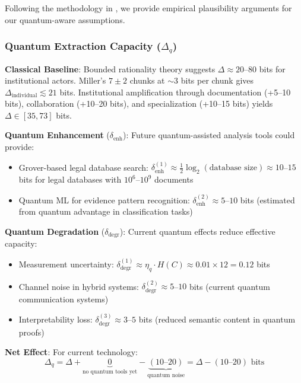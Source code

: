 \documentclass{ieeeaccess}
\begin{document}
Following the methodology in \cite[Section IV-B]{Minka2026CRO}, we provide empirical plausibility arguments for our quantum-aware assumptions.

\subsubsection{Quantum Extraction Capacity ($\Delta_q$)}

\textbf{Classical Baseline}: Bounded rationality theory suggests $\Delta \approx 20$--$80$ bits for institutional actors. Miller's $7 \pm 2$ chunks \cite{Miller1956} at $\sim 3$ bits per chunk gives $\Delta_{\text{individual}} \lesssim 21$ bits. Institutional amplification through documentation (+5--10 bits), collaboration (+10--20 bits), and specialization (+10--15 bits) yields $\Delta \in [35, 73]$ bits.

\textbf{Quantum Enhancement} ($\delta_{\text{enh}}$): Future quantum-assisted analysis tools could provide:
\begin{itemize}
    \item Grover-based legal database search: $\delta_{\text{enh}}^{(1)} \approx \frac{1}{2}\log_2(\text{database size}) \approx 10$--$15$ bits for legal databases with $10^6$--$10^9$ documents
    \item Quantum ML for evidence pattern recognition: $\delta_{\text{enh}}^{(2)} \approx 5$--$10$ bits (estimated from quantum advantage in classification tasks)
\end{itemize}

\textbf{Quantum Degradation} ($\delta_{\text{degr}}$): Current quantum effects reduce effective capacity:
\begin{itemize}
    \item Measurement uncertainty: $\delta_{\text{degr}}^{(1)} \approx \eta_q \cdot H(C) \approx 0.01 \times 12 = 0.12$ bits
    \item Channel noise in hybrid systems: $\delta_{\text{degr}}^{(2)} \approx 5$--$10$ bits (current quantum communication systems)
    \item Interpretability loss: $\delta_{\text{degr}}^{(3)} \approx 3$--$5$ bits (reduced semantic content in quantum proofs)
\end{itemize}

\textbf{Net Effect}: For current technology:
\begin{equation}
    \Delta_q = \Delta + \underbrace{0}_{\text{no quantum tools yet}} - \underbrace{(10\text{--}20)}_{\text{quantum noise}} = \Delta - (10\text{--}20) \text{ bits}
\end{equation}
\end{document}
